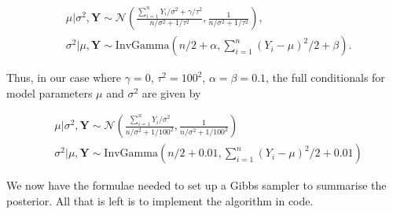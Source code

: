 \documentclass[
]{homework}
\begin{document}
\begin{align*}
  &\mu | \sigma^2, \mathbf Y \sim \mathcal N\left(\frac{\sum_{i = 1}^n Y_i/\sigma^2 + \gamma/\tau^2}{n/\sigma^2 + 1/\tau^2}, \frac{1}{n/\sigma^2 + 1/\tau^2}\right), \\
  &\sigma^2 | \mu, \mathbf Y \sim \mathrm{InvGamma}\left(n/2 + \alpha, \sum_{i = 1}^n (Y_i - \mu)^2/ 2 + \beta\right).
\end{align*}

Thus, in our case where \(\gamma = 0\), \(\tau^2 = 100^2\), \(\alpha = \beta = 0.1\), the full conditionals for model parameters \(\mu\) and \(\sigma^2\) are given by

\begin{align*}
  &\mu | \sigma^2, \mathbf Y \sim \mathcal N\left(\frac{\sum_{i = 1}^n Y_i / \sigma^2}{n/\sigma^2 + 1/100^2}, \frac{1}{n/\sigma^2 + 1/100^2}\right) \\
  &\sigma^2 | \mu, \mathbf Y \sim \mathrm{InvGamma}\left(n/2 + 0.01, \sum_{i = 1}^n (Y_i - \mu)^2/2 + 0.01\right)
\end{align*}

We now have the formulae needed to set up a Gibbs sampler to summarise the posterior. All that is left is to implement the algorithm in code.
\end{document}
